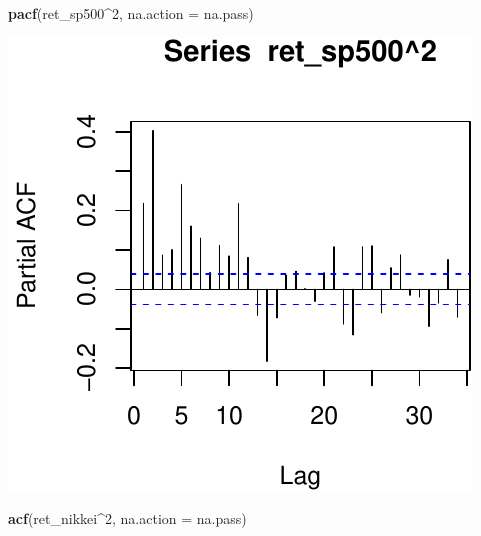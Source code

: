 \documentclass[11pt,]{article}
\newenvironment{Shaded}{\begin{snugshade}}{\end{snugshade}}
\newcommand{\KeywordTok}[1]{\textcolor[rgb]{0.13,0.29,0.53}{\textbf{#1}}}
\newcommand{\DataTypeTok}[1]{\textcolor[rgb]{0.13,0.29,0.53}{#1}}
\newcommand{\DecValTok}[1]{\textcolor[rgb]{0.00,0.00,0.81}{#1}}
\newcommand{\OperatorTok}[1]{\textcolor[rgb]{0.81,0.36,0.00}{\textbf{#1}}}
\newcommand{\NormalTok}[1]{#1}
\begin{document}
\begin{Shaded}
\begin{Highlighting}[]
\KeywordTok{pacf}\NormalTok{(ret_sp500}\OperatorTok{^}\DecValTok{2}\NormalTok{, }\DataTypeTok{na.action =}\NormalTok{ na.pass)}
\end{Highlighting}
\end{Shaded}

\begin{center}\includegraphics{FMC_T4_PhD_ARMA_GARCH_files/figure-latex/ret_ind_ACF_sq-2} \end{center}

\begin{Shaded}
\begin{Highlighting}[]
\KeywordTok{acf}\NormalTok{(ret_nikkei}\OperatorTok{^}\DecValTok{2}\NormalTok{, }\DataTypeTok{na.action =}\NormalTok{ na.pass)}
\end{Highlighting}
\end{Shaded}
\end{document}
